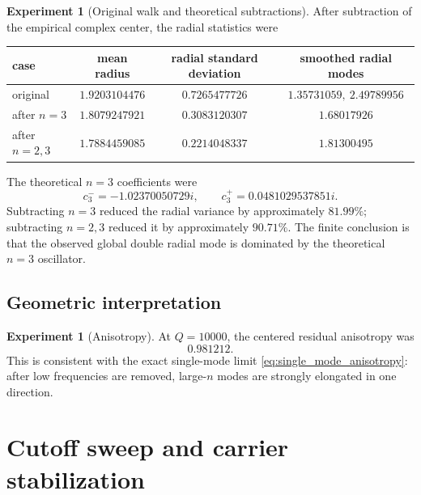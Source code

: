 \documentclass[11pt]{amsart}
\numberwithin{equation}{section}
\theoremstyle{plain}
\theoremstyle{definition}
\newtheorem{experiment}[theorem]{Experiment}
\theoremstyle{remark}
\newcommand{\1}{\mathbf{1}}
\begin{document}
\begin{experiment}[Original walk and theoretical subtractions]
\label{exp:direct_radial_audit_detailed}
After subtraction of the empirical complex center, the radial statistics
were
\begin{center}
\begin{tabular}{lccc}
\toprule
case & mean radius & radial standard deviation & smoothed radial modes\\
\midrule
original & $1.9203104476$ & $0.7265477726$ & $1.35731059,\ 2.49789956$\\
after $n=3$ & $1.8079247921$ & $0.3083120307$ & $1.68017926$\\
after $n=2,3$ & $1.7884459085$ & $0.2214048337$ & $1.81300495$\\
\bottomrule
\end{tabular}
\end{center}
The theoretical $n=3$ coefficients were
\begin{equation}
c_3^-=-1.02370050729i,
\qquad
c_3^+=0.0481029537851i.
\label{eq:numerical_c3_coefficients_detailed}
\end{equation}
Subtracting $n=3$ reduced the radial variance by approximately
$81.99\%$; subtracting $n=2,3$ reduced it by approximately $90.71\%$.
The finite conclusion is that the observed global double radial mode is
dominated by the theoretical $n=3$ oscillator.
\end{experiment}

\subsection{Geometric interpretation}
\label{subsec:numerical_geometric_interpretation}

\begin{experiment}[Anisotropy]
\label{exp:numerical_anisotropy}
At $Q=10000$, the centered residual anisotropy was
\begin{equation}
0.981212.
\label{eq:numerical_anisotropy_value}
\end{equation}
This is consistent with the exact single-mode limit
\eqref{eq:single_mode_anisotropy}: after low frequencies are removed,
large-$n$ modes are strongly elongated in one direction.
\end{experiment}

\section{Cutoff sweep and carrier stabilization}
\label{sec:numerical_cutoff_sweep}
\end{document}
